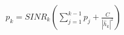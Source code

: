 \documentclass[preview]{standalone}
\begin{document}
\begin{align*}
p_k = SINR_k \left( \sum_{j=1}^{k-1} p_j + \frac{C}{\left|{\hat{h}_k}\right|^2} \right)
\end{align*}
\end{document}
